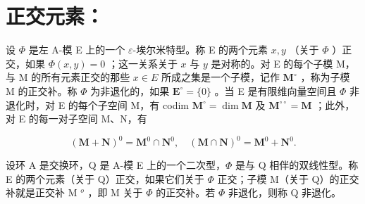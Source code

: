 \section*{正交元素：}

设 \(\Phi\) 是左 A-模 E 上的一个 \(\varepsilon\)-埃尔米特型。称 E 的两个元素 \(x, y\) （关于 \(\Phi\) ）正交，如果 \(\Phi(x, y) = 0\) ；这一关系关于 \(x\) 与 \(y\) 是对称的。对 E 的每个子模 M，与 M 的所有元素正交的那些 \(x \in E\) 所成之集是一个子模，记作 \(\mathbf{M}^{\circ}\) ，称为子模 M 的正交补。称 \(\Phi\) 为非退化的，如果 \(\mathbf{E}^{\circ} = \{0\}\) 。当 E 是有限维向量空间且 \(\Phi\) 非退化时，对 E 的每个子空间 M，有 codim \(\mathbf{M}^{\circ} = \dim \mathbf{M}\) 及 \(\mathbf{M}^{\circ\circ} = \mathbf{M}\) ；此外，对 E 的每一对子空间 M、N，有

\[
(\mathbf {M} + \mathbf {N}) ^ {0} = \mathbf {M} ^ {0} \cap \mathbf {N} ^ {0}, \quad (\mathbf {M} \cap \mathbf {N}) ^ {0} = \mathbf {M} ^ {0} + \mathbf {N} ^ {0}.
\]

设环 A 是交换环，Q 是 A-模 E 上的一个二次型，\(\Phi\) 是与 Q 相伴的双线性型。称 E 的两个元素（关于 Q）正交，如果它们关于 \(\Phi\) 正交；子模 M（关于 Q）的正交补就是正交补 M \(^{o}\) ，即 M 关于 \(\Phi\) 的正交补。若 \(\Phi\) 非退化，则称 Q 非退化。

